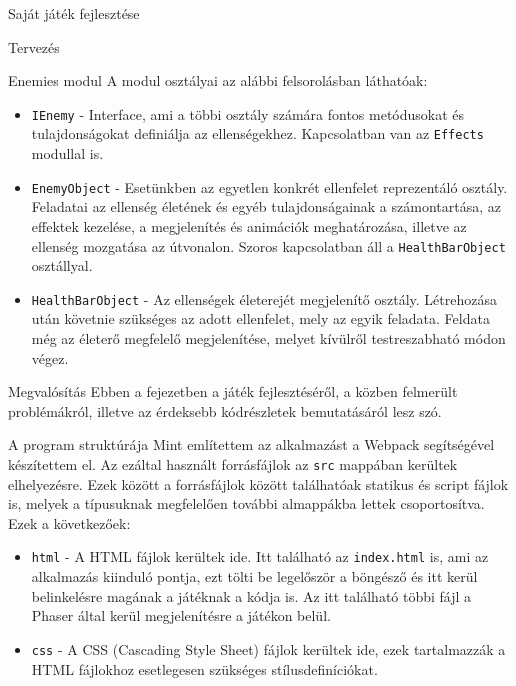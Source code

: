 \begin{MyChapter}{Saját játék fejlesztése}
\begin{MySection}{Tervezés}
\begin{MySubSection}{Enemies modul}
			A modul osztályai az alábbi felsorolásban láthatóak:
			\begin{itemize}			
				\item \texttt{IEnemy} - Interface, ami a többi osztály számára fontos metódusokat és tulajdonságokat definiálja az ellenségekhez. Kapcsolatban van az \texttt{Effects} modullal is.
				
				\item \texttt{EnemyObject} - Esetünkben az egyetlen konkrét ellenfelet reprezentáló osztály. Feladatai az ellenség életének és egyéb tulajdonságainak a számontartása, az effektek kezelése, a megjelenítés és animációk meghatározása, illetve az ellenség mozgatása az útvonalon. Szoros kapcsolatban áll a \texttt{HealthBarObject} osztállyal.
				
				\item \texttt{HealthBarObject} - Az ellenségek életerejét megjelenítő osztály. Létrehozása után követnie szükséges az adott ellenfelet, mely az egyik feladata. Feldata még az életerő megfelelő megjelenítése, melyet kívülről testreszabható módon végez.
				
			\end{itemize}
		\end{MySubSection}

	\end{MySection}
	
	\begin{MySection}{Megvalósítás}	
		Ebben a fejezetben a játék fejlesztéséről, a közben felmerült problémákról, illetve az érdeksebb kódrészletek bemutatásáról lesz szó.
		
		\begin{MySubSection}{A program struktúrája}
			Mint említettem az alkalmazást a Webpack segítségével készítettem el. Az ezáltal használt forrásfájlok az \texttt{src} mappában kerültek elhelyezésre. Ezek között a forrásfájlok között találhatóak statikus és script fájlok is, melyek a típusuknak megfelelően további almappákba lettek csoportosítva. Ezek a következőek:
			\begin{itemize}
				\item \texttt{html} - A HTML fájlok kerültek ide. Itt található az \texttt{index.html} is, ami az alkalmazás kiinduló pontja, ezt tölti be legelőször a böngésző és itt kerül belinkelésre magának a játéknak a kódja is. Az itt található többi fájl a Phaser által kerül megjelenítésre a játékon belül.
				
				\item \texttt{css} - A CSS (Cascading Style Sheet) fájlok kerültek ide, ezek tartalmazzák a HTML fájlokhoz esetlegesen szükséges stílusdefiníciókat.
				

\end{itemize}
\end{MySubSection}
\end{MySection}
\end{MyChapter}
